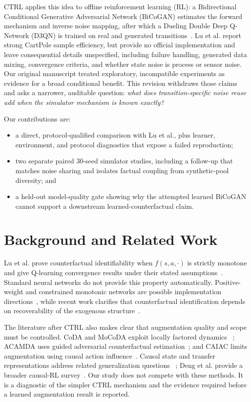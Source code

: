 \documentclass[runningheads]{llncs}
\begin{document}
CTRL applies this idea to offline reinforcement learning (RL): a Bidirectional
Conditional Generative Adversarial Network (BiCoGAN) estimates the forward
mechanism and inverse noise mapping, after which a Dueling Double Deep
Q-Network (D3QN) is trained on real and generated
transitions~\cite{lu2020ctrl,jaiswal2019bicogan}. Lu et al. report
strong CartPole sample efficiency, but provide no official implementation and
leave consequential details unspecified, including failure handling, generated
data mixing, convergence criteria, and whether state noise is process or sensor
noise. Our original manuscript treated exploratory, incompatible experiments as
evidence for a broad conditional benefit. This revision withdraws those claims
and asks a narrower, auditable question: \emph{what does transition-specific
noise reuse add when the simulator mechanism is known exactly?}

Our contributions are:
\begin{itemize}
  \item a direct, protocol-qualified comparison with Lu et al., plus learner,
  environment, and protocol diagnostics that expose a failed reproduction;
  \item two separate paired 30-seed simulator studies, including a follow-up that matches
  noise sharing and isolates factual coupling from synthetic-pool diversity; and
  \item a held-out model-quality gate showing why the attempted learned BiCoGAN
  cannot support a downstream learned-counterfactual claim.
\end{itemize}

\section{Background and Related Work}

Lu et al. prove counterfactual identifiability when $f(s,a,\cdot)$ is strictly
monotone and give Q-learning convergence results under their stated
assumptions~\cite{lu2020ctrl}. Standard neural networks do not provide this
property automatically. Positive-weight and constrained monotonic networks are
possible implementation directions~\cite{runje2023monotonic}, while recent work
clarifies that counterfactual identification depends on recoverability of the
exogenous structure~\cite{chen2025exogenous}.

The literature after CTRL also makes clear that augmentation quality and scope
must be controlled. CoDA and MoCoDA exploit locally factored dynamics
~\cite{pitis2020coda,pitis2022mocoda}; ACAMDA uses guided adversarial
counterfactual estimation~\cite{sun2024acamda}; and CAIAC limits augmentation
using causal action influence~\cite{armengolurpi2024caiac}. Causal state and
transfer representations address related generalization questions
~\cite{huang2022asr,huang2022adarl}; Deng et al. provide a broader causal-RL
survey~\cite{deng2023survey}. Our study does not compete with these methods. It
is a diagnostic of the simpler CTRL mechanism and the evidence required before
a learned augmentation result is reported.
\end{document}
